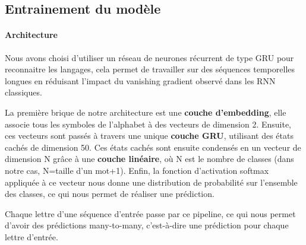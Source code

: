 \documentclass{article}
\begin{document}
\subsection{Entrainement du modèle}

\paragraph{Architecture} Nous avons choisi d'utiliser un réseau de neurones récurrent de type GRU pour reconnaitre les langages,
cela permet de travailler sur des séquences temporelles longues en réduisant l'impact du vanishing gradient observé dans les RNN 
classiques.
\par La première brique de notre architecture est une {\color{Emerald}\textbf{couche d'embedding}}, elle associe tous les symboles de l'alphabet à des vecteurs de dimension 2.
Ensuite, ces vecteurs sont passés à travers une unique {\color{BurntOrange}\textbf{couche GRU}}, utilisant des états cachés de dimension 50. Ces états cachés sont ensuite condensés 
en un vecteur de dimension N grâce à une {\color{Lavender}\textbf{couche linéaire}}, où N est le nombre de classes (dans notre cas, N=taille d'un mot+1). Enfin, la fonction
d'activation softmax appliquée à ce vecteur nous donne une distribution de probabilité sur l'ensemble des classes, ce qui nous permet de réaliser une prédiction.
\par Chaque lettre d'une séquence d'entrée passe par ce pipeline, ce qui nous permet d'avoir des prédictions many-to-many, c'est-à-dire une prédiction pour chaque lettre d'entrée.
\end{document}
